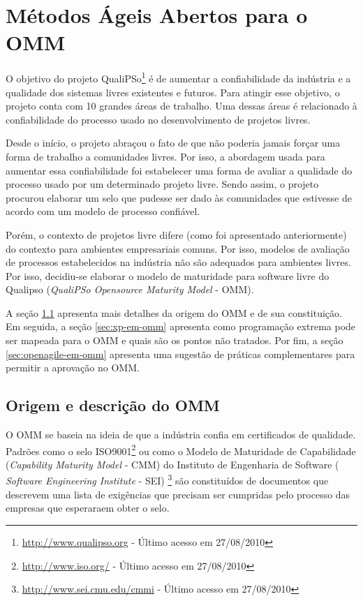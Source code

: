 \chapter{Métodos Ágeis Abertos para o OMM}
\label{cap:omm}

O objetivo do projeto QualiPSo\footnote{\url{http://www.qualipso.org}
  - Último acesso em 27/08/2010} é de aumentar a confiabilidade da
indústria e a qualidade dos sistemas livres existentes e futuros. Para
atingir esse objetivo, o projeto conta com 10 grandes áreas de
trabalho. Uma dessas áreas é relacionado à confiabilidade do processo
usado no desenvolvimento de projetos livres.

Desde o início, o projeto abraçou o fato de que não poderia jamais
forçar uma forma de trabalho a comunidades livres. Por isso, a
abordagem usada para aumentar essa confiabilidade foi estabelecer uma
forma de avaliar a qualidade do processo usado por um determinado
projeto livre. Sendo assim, o projeto procurou elaborar um selo que
pudesse ser dado às comunidades que estivesse de acordo com um modelo
de processo confiável.

Porém, o contexto de projetos livre difere (como foi apresentado
anteriormente) do contexto para ambientes empresariais comuns. Por
isso, modelos de avaliação de processos estabelecidos na indústria não
são adequados para ambientes livres. Por isso, decidiu-se elaborar o
modelo de maturidade para software livre do Qualipso (\textit{QualiPSo
  Opensource Maturity Model} - OMM).

A seção \ref{sec:o-que-eh-omm} apresenta mais detalhes da origem do
OMM e de sua constituição. Em seguida, a seção \ref{sec:xp-em-omm}
apresenta como programação extrema pode ser mapeada para o OMM e quais
são os pontos não tratados. Por fim, a seção
\ref{sec:openagile-em-omm} apresenta uma sugestão de práticas
complementares para permitir a aprovação no OMM.

\section{Origem e descrição do OMM}
\label{sec:o-que-eh-omm}

O OMM se baseia na ideia de que a indústria confia em certificados de
qualidade. Padrões como o selo
ISO9001\footnote{\url{http://www.iso.org/} - Último acesso em
  27/08/2010} ou como o Modelo de Maturidade de Capabilidade
(\textit{Capability Maturity Model} - CMM) do Instituto de Engenharia
de Software ( \textit{Software Engineering Institute} - SEI)
\footnote{\url{http://www.sei.cmu.edu/cmmi} - Último acesso em
  27/08/2010} são constituídos de documentos que descrevem uma lista
de exigências que precisam ser cumpridas pelo processo das empresas
que esperaraem obter o selo.


